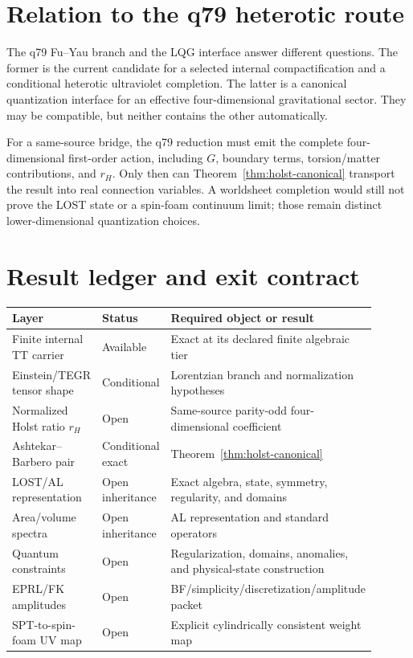 \documentclass[11pt]{article}
\theoremstyle{plain}
\begin{document}
\section{Relation to the q79 heterotic route}

The q79 Fu--Yau branch and the LQG interface answer different questions. The
former is the current candidate for a selected internal compactification and
a conditional heterotic ultraviolet completion. The latter is a canonical
quantization interface for an effective four-dimensional gravitational
sector. They may be compatible, but neither contains the other automatically.

For a same-source bridge, the q79 reduction must emit the complete
four-dimensional first-order action, including \(G\), boundary terms,
torsion/matter contributions, and \(r_H\). Only then can
Theorem~\ref{thm:holst-canonical} transport the result into real connection
variables. A worldsheet completion would still not prove the LOST state or a
spin-foam continuum limit; those remain distinct lower-dimensional
quantization choices.

\section{Result ledger and exit contract}

\begin{center}
\begin{tabular}{p{0.32\linewidth}p{0.16\linewidth}p{0.42\linewidth}}
\hline
Layer & Status & Required object or result\\
\hline
Finite internal TT carrier & Available & Exact at its declared finite algebraic tier\\
Einstein/TEGR tensor shape & Conditional & Lorentzian branch and normalization hypotheses\\
Normalized Holst ratio \(r_H\) & Open & Same-source parity-odd four-dimensional coefficient\\
Ashtekar--Barbero pair & Conditional exact & Theorem~\ref{thm:holst-canonical}\\
LOST/AL representation & Open inheritance & Exact algebra, state, symmetry, regularity, and domains\\
Area/volume spectra & Open inheritance & AL representation and standard operators\\
Quantum constraints & Open & Regularization, domains, anomalies, and physical-state construction\\
EPRL/FK amplitudes & Open & BF/simplicity/discretization/amplitude packet\\
SPT-to-spin-foam UV map & Open & Explicit cylindrically consistent weight map\\
\hline
\end{tabular}
\end{center}
\end{document}

